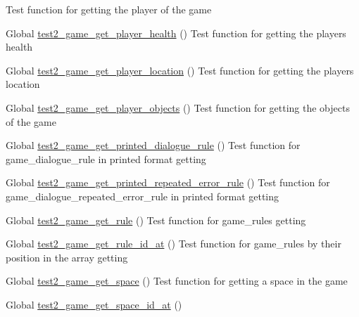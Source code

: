 \begin{DoxyRefList}
%
Test function for getting the player of the game  
\item[Global \mbox{\hyperlink{game__test_8c_a7f50ddd8b2fccc57f5a2f065824ea1d8}{test2\+\_\+game\+\_\+get\+\_\+player\+\_\+health}} ()]\label{test__test000166}%
%
Test function for getting the player\textquotesingle{}s health  
\item[Global \mbox{\hyperlink{game__test_8c_a113c52a92fc38e3baa9b6c5e97179a51}{test2\+\_\+game\+\_\+get\+\_\+player\+\_\+location}} ()]\label{test__test000160}%
%
Test function for getting the player\textquotesingle{}s location  
\item[Global \mbox{\hyperlink{game__test_8c_a5f4be6f55ef6ab19f617dc29a4035e08}{test2\+\_\+game\+\_\+get\+\_\+player\+\_\+objects}} ()]\label{test__test000157}%
%
Test function for getting the objects of the game  
\item[Global \mbox{\hyperlink{game__test_8c_a6b002cf4de84b92d1525604ab1db394a}{test2\+\_\+game\+\_\+get\+\_\+printed\+\_\+dialogue\+\_\+rule}} ()]\label{test__test000312}%
%
Test function for game\+\_\+dialogue\+\_\+rule in printed format getting  
\item[Global \mbox{\hyperlink{game__test_8c_a71d6cfc55fc9afa3a47e950291b312eb}{test2\+\_\+game\+\_\+get\+\_\+printed\+\_\+repeated\+\_\+error\+\_\+rule}} ()]\label{test__test000322}%
%
Test function for game\+\_\+dialogue\+\_\+repeated\+\_\+error\+\_\+rule in printed format getting  
\item[Global \mbox{\hyperlink{game__test_8c_ad9f32afafbc5c0a7879b42f570ccc2a6}{test2\+\_\+game\+\_\+get\+\_\+rule}} ()]\label{test__test000400}%
%
Test function for game\+\_\+rules getting  
\item[Global \mbox{\hyperlink{game__test_8c_accd0df3db5cd5836ae6950f75717fee9}{test2\+\_\+game\+\_\+get\+\_\+rule\+\_\+id\+\_\+at}} ()]\label{test__test000404}%
%
Test function for game\+\_\+rules by their position in the array getting  
\item[Global \mbox{\hyperlink{game__test_8c_a16d48c8d8035f259dedc9460c636e8c5}{test2\+\_\+game\+\_\+get\+\_\+space}} ()]\label{test__test000210}%
%
Test function for getting a space in the game  
\item[Global \mbox{\hyperlink{game__test_8c_a7b4c35438d8c96f3a8ecc425f130f6aa}{test2\+\_\+game\+\_\+get\+\_\+space\+\_\+id\+\_\+at}} ()]\label{test__test000219}%

\end{DoxyRefList}
